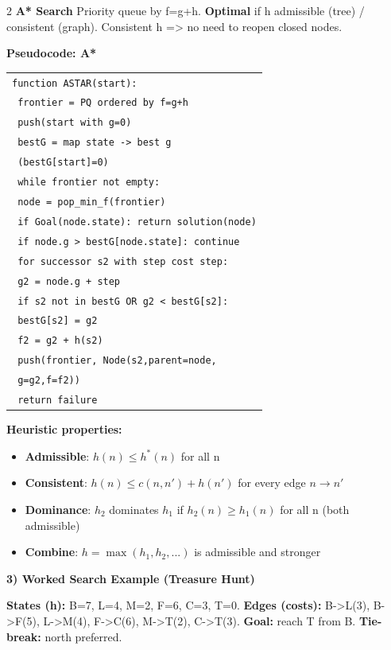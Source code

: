 \documentclass[10pt]{article}
\begin{document}
\begin{multicols*}{2}
\textbf{A* Search}\newline
Priority queue by f=g+h. \textbf{Optimal} if h admissible (tree) / consistent (graph).
Consistent h => no need to reopen closed nodes.

\textbf{Pseudocode: A*}
\begin{tabular}{@{}l@{}}
\texttt{function ASTAR(start):}\\
\texttt{ frontier = PQ ordered by f=g+h}\\
\texttt{ push(start with g=0)}\\
\texttt{ bestG = map state -> best g}\\
\texttt{ (bestG[start]=0)}\\
\texttt{ while frontier not empty:}\\
\texttt{  node = pop\_min\_f(frontier)}\\
\texttt{  if Goal(node.state): return solution(node)}\\
\texttt{  if node.g > bestG[node.state]: continue}\\
\texttt{  for successor s2 with step cost step:}\\
\texttt{   g2 = node.g + step}\\
\texttt{   if s2 not in bestG OR g2 < bestG[s2]:}\\
\texttt{    bestG[s2] = g2}\\
\texttt{    f2 = g2 + h(s2)}\\
\texttt{    push(frontier, Node(s2,parent=node,}\\
\texttt{     g=g2,f=f2))}\\
\texttt{ return failure}
\end{tabular}

\textbf{Heuristic properties:}
\begin{itemize}
  \item \textbf{Admissible}: $h(n) \le h^*(n)$ for all n
  \item \textbf{Consistent}: $h(n) \le c(n,n') + h(n')$ for every edge $n \to n'$
  \item \textbf{Dominance}: $h_2$ dominates $h_1$ if $h_2(n) \ge h_1(n)$ for all n (both admissible)
  \item \textbf{Combine}: $h = \max(h_1,h_2,...)$ is admissible and stronger
\end{itemize}

\textbf{3) Worked Search Example (Treasure Hunt)}

\textbf{States (h):} B=7, L=4, M=2, F=6, C=3, T=0.\newline
\textbf{Edges (costs):} B->L(3), B->F(5), L->M(4), F->C(6), M->T(2), C->T(3).\newline
\textbf{Goal:} reach T from B. \textbf{Tie-break:} north preferred.


\end{multicols*}
\end{document}
